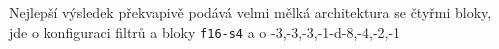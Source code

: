 Nejlepší výsledek překvapivě podává velmi mělká architektura se čtyřmi bloky, jde o konfiguraci filtrů a bloky \texttt{f16-s4} a o   -3,-3,-3,-1-d-8,-4,-2,-1 









